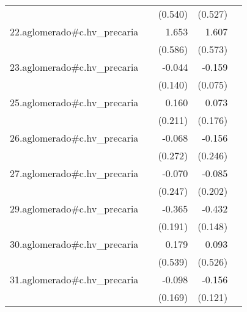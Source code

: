 {\begin{longtable}{l*{4}{D{.}{.}{-1}}}
            &                     &     (0.540)         &     (0.527)         &                     \\
\addlinespace
22.aglomerado#c.hv\_precaria&                     &       1.653\sym{**} &       1.607\sym{**} &                     \\
            &                     &     (0.586)         &     (0.573)         &                     \\
\addlinespace
23.aglomerado#c.hv\_precaria&                     &      -0.044         &      -0.159\sym{*}  &                     \\
            &                     &     (0.140)         &     (0.075)         &                     \\
\addlinespace
25.aglomerado#c.hv\_precaria&                     &       0.160         &       0.073         &                     \\
            &                     &     (0.211)         &     (0.176)         &                     \\
\addlinespace
26.aglomerado#c.hv\_precaria&                     &      -0.068         &      -0.156         &                     \\
            &                     &     (0.272)         &     (0.246)         &                     \\
\addlinespace
27.aglomerado#c.hv\_precaria&                     &      -0.070         &      -0.085         &                     \\
            &                     &     (0.247)         &     (0.202)         &                     \\
\addlinespace
29.aglomerado#c.hv\_precaria&                     &      -0.365         &      -0.432\sym{**} &                     \\
            &                     &     (0.191)         &     (0.148)         &                     \\
\addlinespace
30.aglomerado#c.hv\_precaria&                     &       0.179         &       0.093         &                     \\
            &                     &     (0.539)         &     (0.526)         &                     \\
\addlinespace
31.aglomerado#c.hv\_precaria&                     &      -0.098         &      -0.156         &                     \\
            &                     &     (0.169)         &     (0.121)         &                     \\

\end{longtable}}
